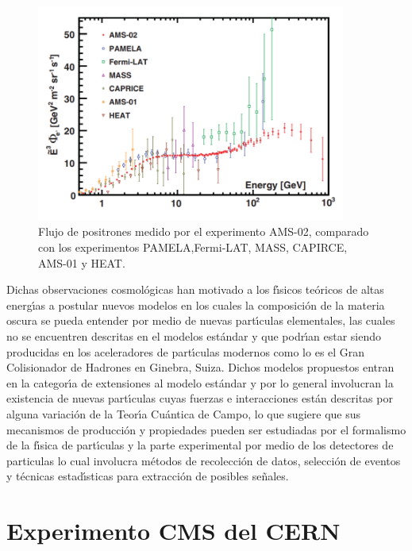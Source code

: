 \begin{figure}
\begin{center}
 \includegraphics[width=4.0in]{AMS_positronflux.png}
  \caption{Flujo de positrones medido por el experimento AMS-02, comparado con los experimentos PAMELA,Fermi-LAT, MASS, CAPIRCE, AMS-01 y HEAT.}
 \label{fig:AMS_positron}
 \end{center}
\end{figure}

Dichas observaciones cosmol\'ogicas han motivado a los f\'{\i}sicos te\'oricos de altas energ\'{\i}as a postular nuevos modelos en los cuales la composici\'on de la materia oscura se pueda entender por medio de nuevas part\'{\i}culas elementales, las cuales no se encuentren descritas en el modelos est\'andar y que podr\'{\i}an estar siendo producidas en los aceleradores de part\'{\i}culas modernos como lo es el Gran Colisionador de Hadrones en Ginebra, Suiza.  Dichos modelos propuestos entran en la categor\'{\i}a de extensiones al modelo est\'andar y por lo general involucran la existencia de nuevas part\'{\i}culas cuyas fuerzas e interacciones est\'an descritas por alguna variaci\'on de la Teor\'{\i}a Cu\'antica de Campo, lo que sugiere que sus mecanismos de producci\'on y propiedades pueden ser estudiadas por el formalismo de la f\'{\i}sica de part\'{\i}culas y la parte experimental por medio de los detectores de particulas lo cual involucra m\'etodos de recolecci\'on de datos, selecci\'on de eventos y t\'ecnicas estad\'{\i}sticas para extracci\'on de posibles se\~nales.

\section{Experimento CMS del CERN}

